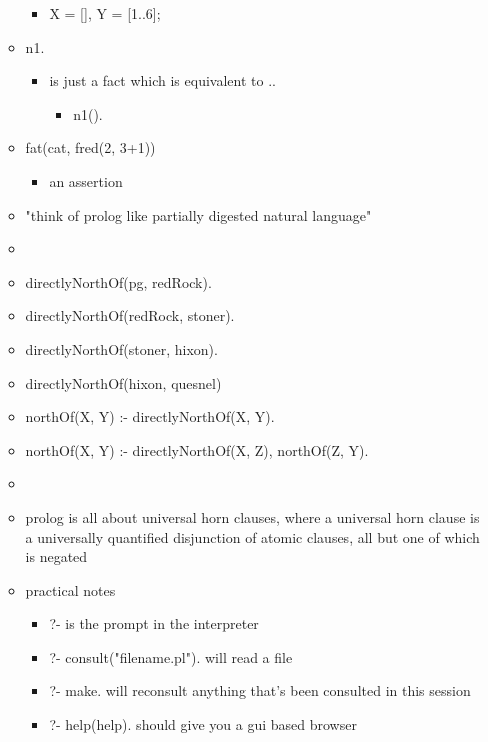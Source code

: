 \documentclass[11pt]{article}
\begin{document}
\begin{itemize}
\begin{itemize}
\begin{itemize}
\item X = [], Y = [1..6];
\end{itemize}
\item n1.
\begin{itemize}
\item is just a fact which is equivalent to ..
\begin{itemize}
\item n1().
\end{itemize}
\end{itemize}
\item fat(cat, fred(2, 3+1))
\begin{itemize}
\item an assertion
\end{itemize}
\item "think of prolog like partially digested natural language"
\item 
\item directlyNorthOf(pg, redRock).
\item directlyNorthOf(redRock, stoner).
\item directlyNorthOf(stoner, hixon).
\item directlyNorthOf(hixon, quesnel)
\item northOf(X, Y) :- directlyNorthOf(X, Y).
\item northOf(X, Y) :- directlyNorthOf(X, Z), northOf(Z, Y).
\item 
\item prolog is all about universal horn clauses, where a universal horn clause is a universally 
quantified disjunction of atomic clauses, all but one of which is negated
\item practical notes
\begin{itemize}
\item ?- is the prompt in the interpreter
\item ?- consult("filename.pl"). will read a file
\item ?- make. will reconsult anything that's been consulted in this session
\item ?- help(help). should give you a gui based browser
\end{itemize}
\end{itemize}
\end{itemize}
\end{document}
